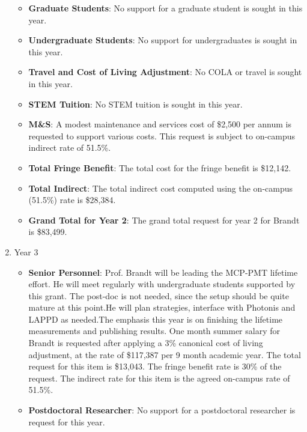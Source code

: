 \begin{enumerate}
\begin{itemize}[noitemsep,nolistsep]
\item{{\bf Graduate Students}: No support for a graduate student is sought in this year. }

\item {{\bf Undergraduate Students}: No support for undergraduates is sought in this year.}

\item{{\bf Travel and Cost of Living Adjustment}: No COLA or travel is sought in this year.}

\item {{\bf STEM Tuition}: No STEM tuition is sought in this year.}

\item {{\bf M\&S}: A modest maintenance and services cost of \$2,500 per annum is requested to support various costs.   This request is subject to on-campus indirect rate of 51.5\%.}

\item {{\bf Total Fringe Benefit}: The total cost for the fringe benefit is \$12,142.}

\item {{\bf Total Indirect}: The total indirect cost computed using the on-campus (51.5\%) rate is \$28,384.}

\item {{\bf Grand Total for Year 2}: The grand total request for year 2 for Brandt is \$83,499.}

\end{itemize}

\item{Year 3}
\begin{itemize}[noitemsep,nolistsep]
\item{{\bf Senior Personnel}: Prof. Brandt will be leading the MCP-PMT lifetime effort. He will meet regularly with undergraduate  students supported by this grant. The post-doc is not needed, since the setup should be quite mature at this point.He will plan strategies, interface with Photonis  and LAPPD as needed.The emphasis this year is on finishing  the lifetime measurements and publishing results. One month summer salary for Brandt is requested after applying a 3\% canonical cost of living adjustment, at the rate of \$117,387 per 9 month academic year.  The total request for this item is \$13,043.   The fringe benefit rate is 30\% of the request.  The indirect rate for this item is the agreed on-campus rate of 51.5\%.}

\item {{\bf Postdoctoral Researcher}: No support for a postdoctoral researcher is request for this year.} 


\end{itemize}
\end{enumerate}
